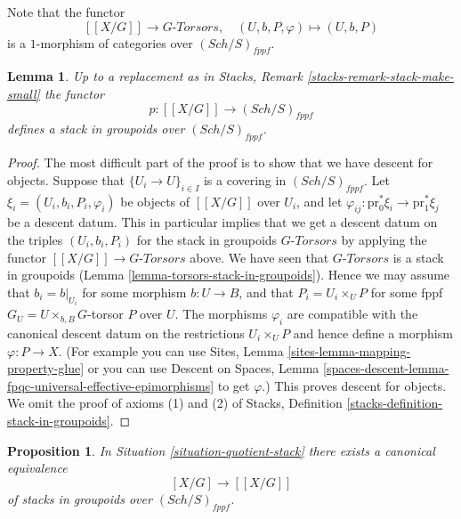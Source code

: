 \documentclass{stacks-project}
\theoremstyle{plain}
\newtheorem{proposition}[subsection]{Proposition}
\newtheorem{lemma}[subsection]{Lemma}
\theoremstyle{definition}
\theoremstyle{remark}
\numberwithin{equation}{subsection}
\def\Sch{\mathit{Sch}}
\begin{document}
\medskip\noindent
Note that the functor
$$
[[X/G]] \longrightarrow G\textit{-Torsors},
\quad
(U, b, P, \varphi) \longmapsto (U, b, P)
$$
is a $1$-morphism of categories over $(\Sch/S)_{fppf}$.

\begin{lemma}
\label{lemma-group-quotient-stack-in-groupoids}
Up to a replacement as in
Stacks, Remark \ref{stacks-remark-stack-make-small}
the functor
$$
p : [[X/G]] \longrightarrow (\Sch/S)_{fppf}
$$
defines a stack in groupoids over $(\Sch/S)_{fppf}$.
\end{lemma}

\begin{proof}
The most difficult part of the proof is to show that we have descent for
objects. Suppose that $\{U_i \to U\}_{i \in I}$ is a covering in
$(\Sch/S)_{fppf}$. Let
$\xi_i = (U_i, b_i, P_i, \varphi_i)$ be objects of $[[X/G]]$ over $U_i$,
and let $\varphi_{ij} : \text{pr}_0^*\xi_i \to \text{pr}_1^*\xi_j$
be a descent datum. This in particular implies that we get a descent
datum on the triples $(U_i, b_i, P_i)$ for the stack in groupoids
$G\textit{-Torsors}$ by applying the functor
$[[X/G]] \to G\textit{-Torsors}$ above. We have seen that
$G\textit{-Torsors}$ is a stack in groupoids
(Lemma \ref{lemma-torsors-stack-in-groupoids}).
Hence we may assume that $b_i = b|_{U_i}$ for some morphism $b : U \to B$, and
that $P_i = U_i \times_U P$ for some fppf $G_U = U \times_{b, B} G$-torsor
$P$ over $U$. The morphisms $\varphi_i$ are compatible
with the canonical descent datum on the restrictions $U_i \times_U P$
and hence define a morphism $\varphi : P \to X$. (For example you
can use
Sites, Lemma \ref{sites-lemma-mapping-property-glue}
or you can use
Descent on Spaces,
Lemma \ref{spaces-descent-lemma-fpqc-universal-effective-epimorphisms}
to get $\varphi$.)
This proves descent for objects.
We omit the proof of axioms (1) and (2) of
Stacks, Definition \ref{stacks-definition-stack-in-groupoids}.
\end{proof}

\begin{proposition}
\label{proposition-equal-quotient-stacks}
In
Situation \ref{situation-quotient-stack}
there exists a canonical equivalence
$$
[X/G] \longrightarrow [[X/G]]
$$
of stacks in groupoids over $(\Sch/S)_{fppf}$.
\end{proposition}
\end{document}
